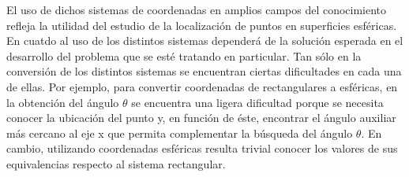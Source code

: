 \hspace{4mm} El uso de dichos sistemas de coordenadas en amplios campos del conocimiento refleja la utilidad del estudio de la localización de puntos en superficies esféricas. En cuatdo al uso de los distintos sistemas dependerá de la solución esperada en el desarrollo del problema que se esté tratando en particular. Tan sólo en la conversión de los distintos sistemas se encuentran ciertas dificultades en cada una de ellas. Por ejemplo, para convertir coordenadas de rectangulares a esféricas, en la obtención del ángulo ${\theta}$ se encuentra una ligera dificultad porque se necesita conocer la ubicación del punto y, en función de éste, encontrar el ángulo auxiliar más cercano al eje x que permita complementar la búsqueda del ángulo ${\theta}$. En cambio, utilizando coordenadas esféricas resulta trivial conocer los valores de sus equivalencias respecto al sistema rectangular. \cite{ecured}
